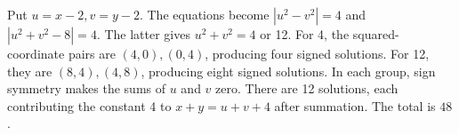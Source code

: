 Put $u=x-2,v=y-2$. The equations become $|u^2-v^2|=4$ and $|u^2+v^2-8|=4$. The latter gives $u^2+v^2=4$ or 12. For 4, the squared-coordinate pairs are $(4,0),(0,4)$, producing four signed solutions. For 12, they are $(8,4),(4,8)$, producing eight signed solutions. In each group, sign symmetry makes the sums of $u$ and $v$ zero. There are 12 solutions, each contributing the constant 4 to $x+y=u+v+4$ after summation. The total is $\boxed{48}$.
